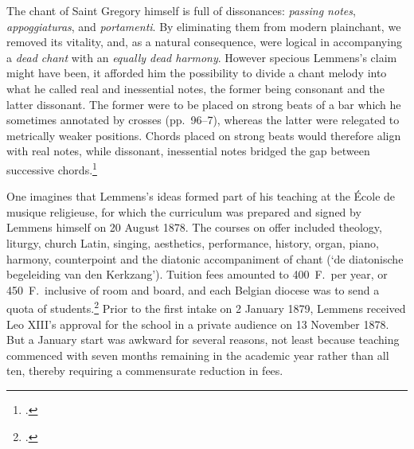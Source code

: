   {\cite[4, 120]{Lemmenschantgregoriensa1886}}
{The chant of Saint Gregory himself is full of dissonances: \emph{passing notes}, \emph{appoggiaturas}, and \emph{portamenti}. By eliminating them from modern plainchant, we removed its vitality, and, as a natural consequence, were logical in accompanying a \emph{dead chant} with an \emph{equally dead harmony}.}
\noindent
However specious Lemmens's claim might have been, it afforded him the possibility to divide a chant melody into what he called real and inessential notes, the former being consonant and the latter dissonant.
The former were to be placed on strong beats of a bar which he sometimes annotated by crosses (pp.~96--7), whereas the latter were relegated to metrically weaker positions.
Chords placed on strong beats would therefore align with real notes, while dissonant, inessential notes bridged the gap between successive chords.\footcite[14]{Lhoumeauharmonisationmelodiesgregoriennes1884}

One imagines that Lemmens's ideas formed part of his teaching at the École de musique religieuse, for which the curriculum was prepared and signed by Lemmens himself on 20 August 1878.
The courses on offer included theology, liturgy, church Latin, singing, aesthetics, performance, history, organ, piano, harmony, counterpoint and the diatonic accompaniment of chant (`de diatonische begeleiding van den Kerkzang').
Tuition fees amounted to 400~F.\ per year, or 450~F.\ inclusive of room and board, and each Belgian diocese was to send a quota of students.\footcite[Prospectus printed in][34, 39--42]{ErensJaakLemmensstichter}
Prior to the first intake on 2 January 1879, Lemmens received Leo XIII's approval for the school in a private audience on 13 November 1878.
But a January start was awkward for several reasons, not least because teaching commenced with seven months remaining in the academic year rather than all ten, thereby requiring a commensurate reduction in fees.

